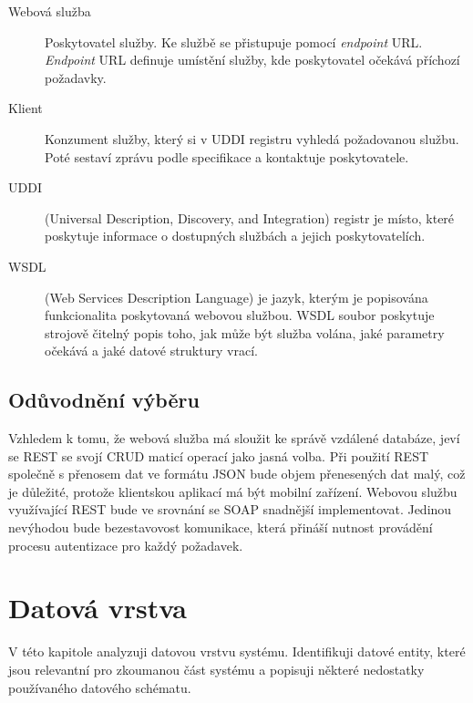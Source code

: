 \documentclass{diplomka}
\begin{document}
\begin{description}
\item [Webová služba] Poskytovatel služby. Ke službě se přistupuje pomocí \emph{endpoint} URL. \emph{Endpoint} URL definuje umístění služby, kde poskytovatel očekává příchozí požadavky.
\item [Klient] Konzument služby, který si v UDDI registru vyhledá požadovanou službu. Poté sestaví zprávu podle specifikace a kontaktuje poskytovatele.
\item [UDDI\cite{uddi}] (Universal Description, Discovery, and Integration) registr je místo, které poskytuje informace o dostupných službách a jejich poskytovatelích. 
\item [WSDL\cite{wsdl}] (Web Services Description Language) je jazyk, kterým je popisována funkcionalita poskytovaná webovou službou. WSDL soubor poskytuje strojově čitelný popis toho, jak může být služba volána, jaké parametry očekává a jaké datové struktury vrací.
\end{description}

\subsection{Odůvodnění výběru}
Vzhledem k tomu, že webová služba má sloužit ke správě vzdálené databáze, jeví se REST se svojí CRUD maticí operací jako jasná volba. Při použití REST společně s přenosem dat ve formátu JSON bude objem přenesených dat malý, což je důležité, protože klientskou aplikací má být mobilní zařízení. Webovou službu využívající REST bude ve srovnání se SOAP snadnější implementovat. Jedinou nevýhodou bude bezestavovost komunikace, která přináší nutnost provádění procesu autentizace pro každý požadavek.

\section{Datová vrstva}
V této kapitole analyzuji datovou vrstvu systému. Identifikuji datové entity, které jsou relevantní pro zkoumanou část systému a popisuji některé nedostatky používaného datového schématu.
\end{document}
